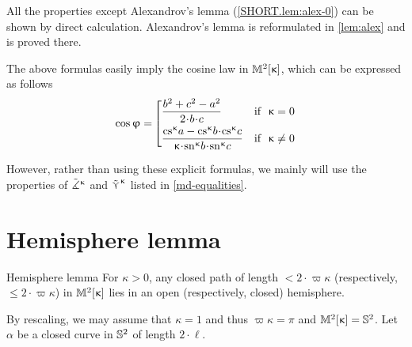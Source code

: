 All the properties except Alexandrov's lemma (\ref{SHORT.lem:alex-0}) can be shown by direct calculation. Alexandrov's lemma is reformulated in \ref{lem:alex} and is proved there.




The above formulas easily imply  the cosine law in $\mathbb{M}_{{}}^{2}[{\upkappa}]$, which can be expressed as follows
\[\cos\phi
=\l[\begin{aligned}
&\frac{b^2+c^2-a^2}{2\cdot b\cdot c}
&\text{if}&\ \ \kappa=0
\\
&\frac{\cs\kappa a-\cs\kappa b\cdot\cs\kappa c}{\kappa\cdot\sn\kappa b\cdot\sn\kappa c}
&\text{if}&\ \ \kappa\not=0
\end{aligned}\r.\]

However, rather than using these explicit formulas,  we mainly will use
the properties of $\tilde{\measuredangle}^{\upkappa}$ and $\mathop{\tilde\curlyvee}\nolimits^{\upkappa}$ listed in \ref{md-equalities}.

\section{Hemisphere lemma}\label{curves-in-model}





\begin{thm}{Hemisphere lemma}
\label{lem:hemisphere}
For $\kappa>0$, any closed path of length $<2\cdot \varpi\kappa$ (respectively, $\le2\cdot \varpi\kappa$) in $\mathbb{M}_{{}}^{2}[{\upkappa}]$ lies in an open (respectively, closed) hemisphere. 
\end{thm}

 By rescaling, we may assume that $\kappa=1$ and thus $\varpi\kappa=\pi$ and $\mathbb{M}_{{}}^{2}[{\upkappa}]=\mathbb{S}^2$.
Let $\alpha$ be a closed curve in $\mathbb{S}^2$ of length $2\cdot\ell$.

